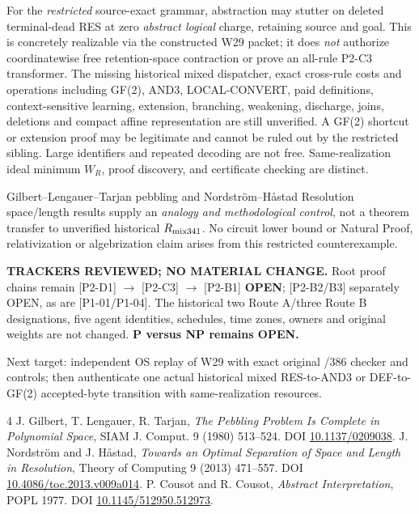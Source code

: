 \documentclass[11pt]{article}
\begin{document}
For the \emph{restricted} source-exact grammar, abstraction may stutter on deleted terminal-dead RES at zero \emph{abstract logical} charge, retaining source and goal. This is concretely realizable via the constructed W29 packet; it does \emph{not} authorize coordinatewise free retention-space contraction or prove an all-rule P2-C3 transformer. The missing historical mixed dispatcher, exact cross-rule costs and operations including GF(2), AND3, LOCAL-CONVERT, paid definitions, context-sensitive learning, extension, branching, weakening, discharge, joins, deletions and compact affine representation are still unverified. A GF(2) shortcut or extension proof may be legitimate and cannot be ruled out by the restricted sibling. Large identifiers and repeated decoding are not free. Same-realization ideal minimum $W_R$, proof discovery, and certificate checking are distinct.

Gilbert--Lengauer--Tarjan pebbling and Nordstr\"om--H{\aa}stad Resolution space/length results supply an \emph{analogy and methodological control}, not a theorem transfer to unverified historical $R_{\rm mix341}$. No circuit lower bound or Natural Proof, relativization or algebrization claim arises from this restricted counterexample.

\textbf{TRACKERS REVIEWED; NO MATERIAL CHANGE.} Root proof chains remain [P2-D1] $\to$ [P2-C3] $\to$ [P2-B1] \textbf{OPEN}; [P2-B2/B3] separately OPEN, as are [P1-01/P1-04]. The historical two Route A/three Route B designations, five agent identities, schedules, time zones, owners and original weights are not changed. \textbf{P versus NP remains OPEN.}

Next target: independent OS replay of W29 with exact original /386 checker and controls; then authenticate one actual historical mixed RES-to-AND3 or DEF-to-GF(2) accepted-byte transition with same-realization resources.

\begin{thebibliography}{4}
 J. Gilbert, T. Lengauer, R. Tarjan, \emph{The Pebbling Problem Is Complete in Polynomial Space}, SIAM J. Comput. 9 (1980) 513--524. DOI \href{https://doi.org/10.1137/0209038}{10.1137/0209038}.
 J. Nordstr\"om and J. H{\aa}stad, \emph{Towards an Optimal Separation of Space and Length in Resolution}, Theory of Computing 9 (2013) 471--557. DOI \href{https://doi.org/10.4086/toc.2013.v009a014}{10.4086/toc.2013.v009a014}.
 P. Cousot and R. Cousot, \emph{Abstract Interpretation}, POPL 1977. DOI \href{https://doi.org/10.1145/512950.512973}{10.1145/512950.512973}.
\end{thebibliography}
\end{document}
